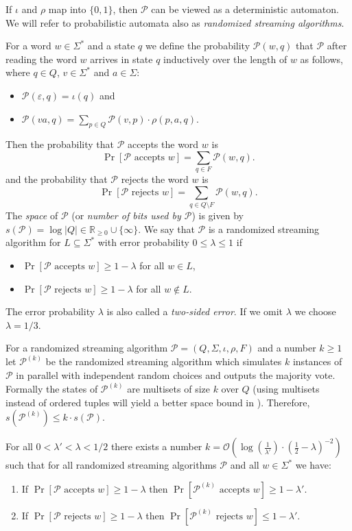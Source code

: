 \documentclass{theoretics}
\renewcommand{\O}{\mathcal{O}}
\renewcommand{\P}{\mathcal{P}}
\renewcommand{\geq}{\geqslant}
\renewcommand{\leq}{\leqslant}
\renewcommand{\ge}{\geq}
\renewcommand{\le}{\leq}
\begin{document}
If $\iota$ and $\rho$ map into $\{0,1\}$, then $\P$ can be viewed as a deterministic automaton.
We will refer to probabilistic automata also as \emph{randomized streaming algorithms}. 

For a word $w \in \Sigma^*$ and a state $q$ we define the probability $\P(w,q)$ that $\P$ after reading the word $w$ arrives
in state $q$ inductively over the length of $w$ as follows, where $q \in Q$, $v \in \Sigma^*$ and $a \in \Sigma$:
\begin{itemize}
\item $\P(\varepsilon,q) = \iota(q)$ and
\item $\P(va,q) = \sum_{p \in Q} \P(v,p) \cdot \rho(p,a,q)$.
\end{itemize}
Then the probability that $\P$ accepts the word $w$ is 
\[ \Pr[\P \text{ accepts } w] = \sum_{q \in F} \P(w,q).\] 
and the probability
that $\P$ rejects the word $w$ is 
\[ \Pr[\P \text{ rejects } w] = \sum_{q \in Q \setminus F} \P(w,q).\]
The {\em space} of $\P$ (or {\em number of bits used by $\P$}) is given by
$s(\P) = \log |Q| \in \mathbb{R}_{\ge 0} \cup \{ \infty \}$.
We say that $\P$ is a randomized streaming algorithm for $L \subseteq \Sigma^*$
with error probability $0 \le \lambda \le 1$ if
\begin{itemize}
\item $\Pr[\P \text{ accepts } w]  \ge 1 - \lambda$ for all $w \in L$,
\item $\Pr[\P \text{ rejects } w]  \ge 1 - \lambda$  for all $w \notin L$.
\end{itemize}
The error probability $\lambda$ is also called a {\em two-sided error}.
If we omit $\lambda$ we choose $\lambda = 1/3$.

For a randomized streaming algorithm $\P = (Q,\Sigma,\iota,\rho,F)$ and a number $k \ge 1$
let $\P^{(k)}$ be the randomized streaming algorithm which simulates $k$ instances of $\P$
in parallel with independent random choices and outputs the majority vote.
Formally the states of $\P^{(k)}$ are multisets of size $k$ over $Q$ (using multisets instead of 
ordered tuples will yield a better space bound in ).
Therefore, $s(\P^{(k)}) \le k \cdot s(\P)$.

\begin{lemma}
	\label{lem:amplification}
	For all $0 < \lambda' < \lambda < 1/2$ there exists a number
	$k = \O(\log \left( \frac{1}{\lambda'} \right) \cdot \left(\frac{1}{2}-\lambda\right)^{-2})$
	such that
	for all randomized streaming algorithms $\P$ and all $w \in \Sigma^*$ we have:
	\begin{enumerate}[label=(\roman{*}), ref=(\roman{*})]
	\item If $\Pr[\P \text{ accepts } w]  \ge 1-\lambda$ then
	$\Pr[\P^{(k)} \text{ accepts } w] \ge 1-\lambda'$.
	\item If $\Pr[\P \text{ rejects } w]  \ge 1-\lambda$ then
	$\Pr[\P^{(k)} \text{ rejects } w] \le 1-\lambda'$.
	\end{enumerate}
\end{lemma}
\end{document}
